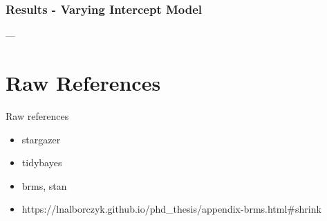 \documentclass{beamer}
\begin{document}
\begin{frame}
\frametitle{Results - Varying Intercept Model}
---
\end{frame}

\section{Raw References}

\begin{frame}{Raw references}
    \begin{itemize}
        \item stargazer
        \item tidybayes
        \item brms, stan
        \item https://lnalborczyk.github.io/phd_thesis/appendix-brms.html#shrink
    \end{itemize}
\end{frame}
\end{document}

